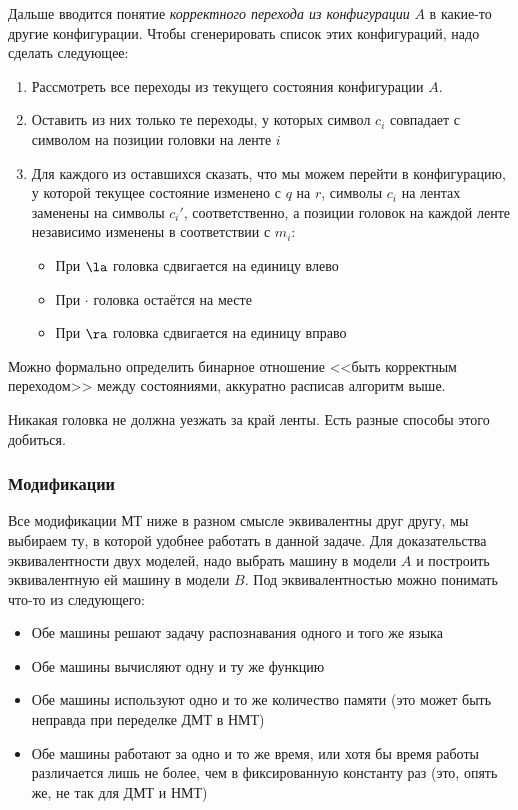 	Дальше вводится понятие \textit{корректного перехода из конфигурации} $A$ в какие-то другие конфигурации.
	Чтобы сгенерировать список этих конфигураций, надо сделать следующее:
	\begin{enumerate}
		\item Рассмотреть все переходы из текущего состояния конфигурации $A$.
		\item Оставить из них только те переходы, у которых символ $c_i$ совпадает с символом на позиции головки на ленте $i$
		\item
			Для каждого из оставшихся сказать, что мы можем перейти в конфигурацию, у которой текущее состояние изменено с $q$ на $r$,
			символы $c_i$ на лентах заменены на символы $c_i'$, соответственно, а позиции головок на каждой ленте независимо изменены в соответствии с $m_i$:
			\begin{itemize}
				\item При $\la$ головка сдвигается на единицу влево
				\item При $\cdot$ головка остаётся на месте
				\item При $\ra$ головка сдвигается на единицу вправо
			\end{itemize}
	\end{enumerate}
	\begin{Rem}
		Можно формально определить бинарное отношение <<быть корректным переходом>> между состояниями,
		аккуратно расписав алгоритм выше.
	\end{Rem}
	\begin{Rem}
		Никакая головка не должна уезжать за край ленты.
		Есть разные способы этого добиться.
	\end{Rem}

\subsubsection{Модификации}
	Все модификации МТ ниже в разном смысле эквивалентны друг другу, мы выбираем ту, в которой удобнее работать в данной задаче.
	Для доказательства эквивалентности двух моделей, надо выбрать машину в модели $A$ и построить эквивалентную ей машину в модели $B$.
	Под эквивалентностью можно понимать что-то из следующего:
	\begin{itemize}
		\item Обе машины решают задачу распознавания одного и того же языка
		\item Обе машины вычисляют одну и ту же функцию
		\item Обе машины используют одно и то же количество памяти (это может быть неправда при переделке ДМТ в НМТ)
		\item Обе машины работают за одно и то же время, или хотя бы время работы различается лишь не более, чем в фиксированную константу раз (это, опять же, не так для ДМТ и НМТ)
	\end{itemize}

